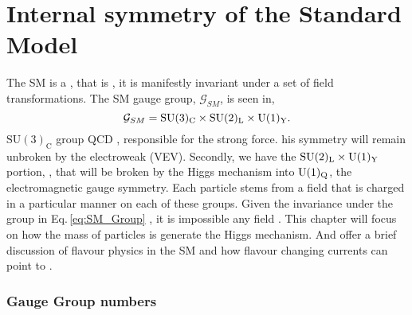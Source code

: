 \section{Internal symmetry of the Standard Model}\label{section:Symmetries_SM}
%
The SM is a     , that is , it is manifestly invariant under a set of field transformations. The SM gauge group, $\mathcal{G}_{SM}$, is seen in, 
%
\begin{equation}
\mathcal{G}_{SM} = \mathrm{SU}(3)_{\mathrm{C}} \times \mathrm{SU}(2)_{\mathrm{L}} \times \mathrm{U}(1)_{\mathrm{Y}}.
\label{eq:SM_Group}
\end{equation} 
%
 $\mathrm{SU}(3)_{\mathrm{C}}$  group   QCD , responsible for the strong force. his symmetry will remain unbroken by the electroweak  (VEV). Secondly, we have the $\mathrm{SU}(2)_{\mathrm{L}} \times \mathrm{U}(1)_{\mathrm{Y}}$ portion, ,  that will be broken by the Higgs mechanism into $\mathrm{U}(1)_{\mathrm{Q}}$, the electromagnetic gauge symmetry.
%
Each particle stems from a field that is charged in a particular manner on each of these groups.  
%
Given the invariance under the group in Eq.\,\eqref{eq:SM_Group} , it is impossible   any field . This chapter will focus on how the mass of particles is generate  the Higgs mechanism. And offer a brief discussion of flavour physics in the SM and how flavour changing currents can point to  . 


\subsubsection{Gauge Group numbers}

